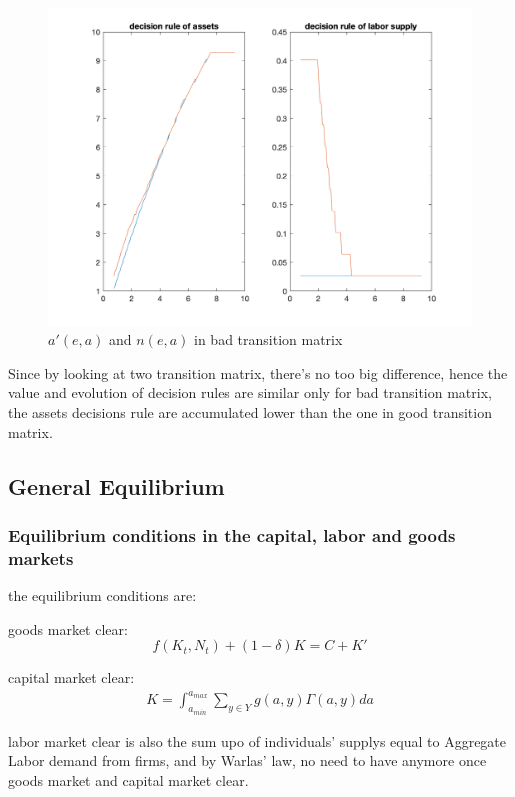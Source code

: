 \begin{figure}[htbp]
\centering
\includegraphics[width=\textwidth]{img/Q1-bad.png}
\caption{$a'(e,a)$ and $n(e,a)$ in bad transition matrix}
\end{figure}

Since by looking at two transition matrix, there's no too big difference, hence the value and evolution of decision rules are similar only for bad transition matrix, the assets decisions rule are accumulated lower than the one in good transition matrix. 

\subsection{General Equilibrium}
\subsubsection{Equilibrium conditions in the capital, labor and goods markets}

the equilibrium conditions are:

goods market clear:
\[ f(K_t,N_t) + (1-\delta)K = C + K'\]

capital market clear:
\begin{align}
K = \int_{a_{min}}^{a_{max}} \sum_{y\in Y} g(a,y) \Gamma (a,y) d a
\end{align}

labor market clear is also the sum upo of individuals' supplys equal to Aggregate Labor demand from firms, and by Warlas' law, no need to have anymore once goods market and capital market clear.



